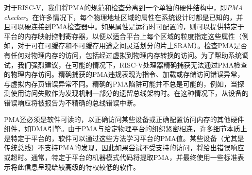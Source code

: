 {\iffalse
For RISC-V, we separate out specification and checking of PMAs into a
separate hardware structure, the {\em PMA checker}.  In many cases,
the attributes are known at system design time for each physical
address region, and can be hardwired into the PMA checker.  Where the
attributes are run-time configurable, platform-specific memory-mapped
control registers can be provided to specify these attributes at a
granularity appropriate to each region on the platform (e.g., for an
on-chip SRAM that can be flexibly divided between cacheable and
uncacheable uses).  PMAs are checked for any access to physical
memory, including accesses that have undergone virtual to physical
memory translation.  To aid in system debugging, we strongly recommend
that, where possible, RISC-V processors precisely trap physical memory
accesses that fail PMA checks.  Precisely trapped PMA violations manifest
as instruction, load, or store access-fault exceptions, distinct from
virtual-memory page-fault exceptions. Precise PMA traps might not always be
possible, for example, when probing a legacy bus architecture that
uses access failures as part of the discovery mechanism.  In this
case, error responses from slave devices will be reported as imprecise
bus-error interrupts.
\fi
对于RISC-V，我们将PMA的规范和检查分离到一个单独的硬件结构中，即{\em PMA checker}。在许多情况下，每个物理地址区域的属性在系统设计时都是已知的，并且可以硬连接到PMA检查器中。如果属性是运行时可配置的，则可以提供特定于平台的内存映射控制寄存器，以便以适合平台上每个区域的粒度指定这些属性（例如，对于可在可缓存和不可缓存用途之间灵活划分的片上SRAM）。检查PMA是否有任何对物理内存的访问，包括经过虚拟到物理内存转换的访问。为了帮助系统调试，我们强烈建议，在可能的情况下，RISC-V处理器精确捕获无法通过PMA检查的物理内存访问。精确捕获的PMA违规表现为指令、加载或存储访问错误异常，与虚拟内存页错误异常不同。精确的PMA陷阱可能并不总是可能的，例如，当探测使用访问失败作为发现机制一部分的遗留总线架构时。在这种情况下，从设备的错误响应将被报告为不精确的总线错误中断。

\iffalse
PMAs must also be readable by software to correctly access certain
devices or to correctly configure other hardware components that
access memory, such as DMA engines.  As PMAs are tightly tied to a
given physical platform's organization, many details are inherently
platform-specific, as is the means by which software can learn the PMA
values for a platform.  Some
devices, particularly legacy buses, do not support discovery of PMAs
and so will give error responses or time out if an unsupported access
is attempted.  Typically, platform-specific machine-mode code will
extract PMAs and ultimately present this information to higher-level
less-privileged software using some standard representation.
\fi
PMA还必须是软件可读的，以正确访问某些设备或正确配置访问内存的其他硬件组件，如DMA引擎。由于PMA与给定物理平台的组织紧密相连，许多细节本质上是特定于平台的，软件可以通过这些方法学习平台的PMA值。某些设备（尤其是传统总线）不支持PMA的发现，因此如果尝试不受支持的访问，将给出错误响应或超时。通常，特定于平台的机器模式代码将提取PMA，并最终使用一些标准表示将此信息呈现给较高级的特权较低的软件。

}
